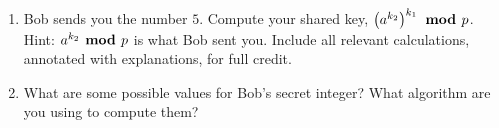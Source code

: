 \begin{enumerate}[labelindent=0pt, leftmargin=0pt]
\begin{enumerate}
        \item  Bob sends you the number $5$. Compute  your shared key, $\left(a^{k_2}\right)^{k_1}  
        \textrm{\bf ~mod~} p$.
        Hint: $a^{k_2} \textrm{\bf ~mod~} p$ is what Bob sent you.  Include all relevant calculations, annotated with explanations, 
        for full credit.
        
        
        \item What are some possible values for Bob's secret integer?  What 
        algorithm are you using to compute them?
        \end{enumerate}


    \end{enumerate}

\newpage

